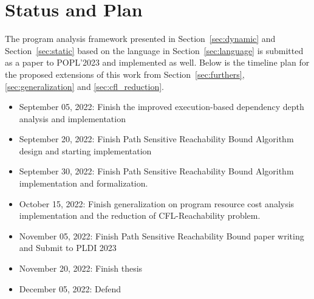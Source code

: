 \documentclass[a4paper,11pt]{article}
\begin{document}
\section{Status and Plan}
The program analysis framework presented in Section~\ref{sec:dynamic} and Section~\ref{sec:static} 
based on the language in Section~\ref{sec:language}
 is submitted as a paper to POPL'2023 and implemented as well. 
 Below is the timeline plan for the proposed extensions of this work
 from Section~\ref{sec:furthers}, \ref{sec:generalization} and \ref{sec:cfl_reduction}.
\begin{itemize}
\item September 05, 2022: Finish the improved execution-based dependency depth analysis and implementation
\item September 20, 2022: Finish Path Sensitive Reachability Bound Algorithm design and starting implementation
\item September 30, 2022: Finish Path Sensitive Reachability Bound Algorithm implementation and formalization.
\item October 15, 2022:  Finish generalization on program resource cost analysis implementation 
and the reduction of CFL-Reachability problem.
\item November 05, 2022: Finish Path Sensitive Reachability Bound paper writing and Submit to PLDI 2023
\item November 20, 2022: Finish thesis
\item December 05, 2022: Defend
\end{itemize}




\end{document}
